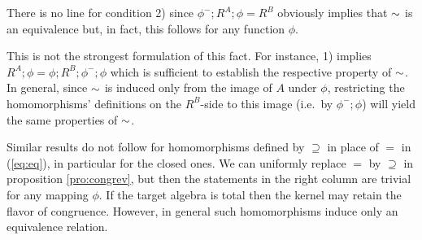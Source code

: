 \documentclass[10pt]{article}
\begin{document}
\noindent
There is no line for condition 2) since $\phi^-;R^A;\phi=R^B$
obviously implies that $\sim$ is an equivalence but, in fact, this
follows for any function $\phi$.

This is not the strongest formulation of this fact.
For instance, 1) implies
$R^A;\phi=\phi;R^B;\phi^-;\phi$ which is sufficient to establish the
respective property of $\sim$. In general, since $\sim$ is induced
only from the image of $A$ under $\phi$, restricting the
homomorphisms' definitions on the $R^B$-side to this image (i.e.\ by
$\phi^-;\phi$) will yield the same properties of $\sim$.

Similar results do not follow for homomorphisms defined by $\supseteq$
in place of $=$ in (\ref{eq:eq}), in particular for the closed ones.
We can uniformly replace $=$ by $\supseteq$ in proposition
\ref{pro:congrev}, but then the statements in the right column are trivial for
any mapping $\phi$.  If the target algebra is total then the kernel
may retain the flavor of congruence. However, in general such
homomorphisms induce only an equivalence relation.


\end{document}
